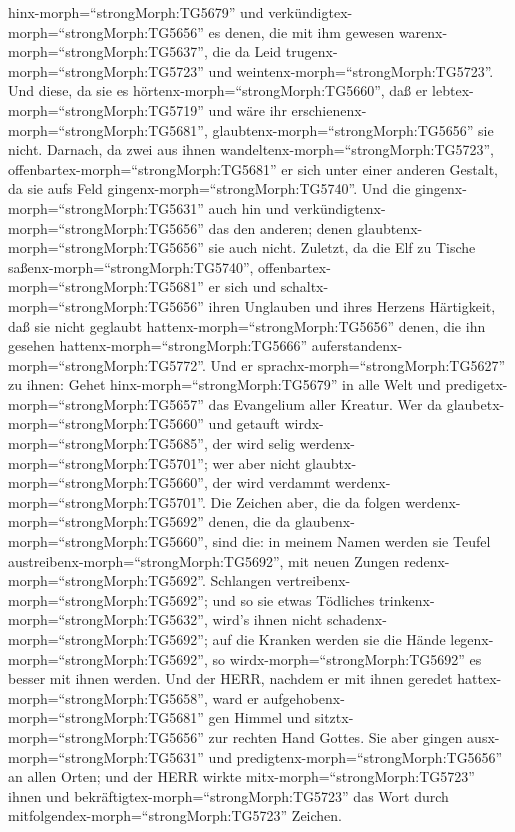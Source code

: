 hinx-morph=``strongMorph:TG5679'' und
verkündigtex-morph=``strongMorph:TG5656'' es denen, die mit ihm gewesen
warenx-morph=``strongMorph:TG5637'', die da Leid
trugenx-morph=``strongMorph:TG5723'' und
weintenx-morph=``strongMorph:TG5723''.  Und diese, da sie
es hörtenx-morph=``strongMorph:TG5660'', daß er
lebtex-morph=``strongMorph:TG5719'' und wäre ihr
erschienenx-morph=``strongMorph:TG5681'',
glaubtenx-morph=``strongMorph:TG5656'' sie nicht.  Darnach,
da zwei aus ihnen wandeltenx-morph=``strongMorph:TG5723'',
offenbartex-morph=``strongMorph:TG5681'' er sich unter einer anderen
Gestalt, da sie aufs Feld gingenx-morph=``strongMorph:TG5740''.
 Und die gingenx-morph=``strongMorph:TG5631'' auch hin und
verkündigtenx-morph=``strongMorph:TG5656'' das den anderen; denen
glaubtenx-morph=``strongMorph:TG5656'' sie auch nicht. 
Zuletzt, da die Elf zu Tische saßenx-morph=``strongMorph:TG5740'',
offenbartex-morph=``strongMorph:TG5681'' er sich und
schaltx-morph=``strongMorph:TG5656'' ihren Unglauben und ihres Herzens
Härtigkeit, daß sie nicht geglaubt hattenx-morph=``strongMorph:TG5656''
denen, die ihn gesehen hattenx-morph=``strongMorph:TG5666''
auferstandenx-morph=``strongMorph:TG5772''.  Und er
sprachx-morph=``strongMorph:TG5627'' zu ihnen: Gehet
hinx-morph=``strongMorph:TG5679'' in alle Welt und
predigetx-morph=``strongMorph:TG5657'' das Evangelium aller Kreatur.
 Wer da glaubetx-morph=``strongMorph:TG5660'' und getauft
wirdx-morph=``strongMorph:TG5685'', der wird selig
werdenx-morph=``strongMorph:TG5701''; wer aber nicht
glaubtx-morph=``strongMorph:TG5660'', der wird verdammt
werdenx-morph=``strongMorph:TG5701''.  Die Zeichen aber,
die da folgen werdenx-morph=``strongMorph:TG5692'' denen, die da
glaubenx-morph=``strongMorph:TG5660'', sind die: in meinem Namen werden
sie Teufel austreibenx-morph=``strongMorph:TG5692'', mit neuen Zungen
redenx-morph=``strongMorph:TG5692''.  Schlangen
vertreibenx-morph=``strongMorph:TG5692''; und so sie etwas Tödliches
trinkenx-morph=``strongMorph:TG5632'', wird's ihnen nicht
schadenx-morph=``strongMorph:TG5692''; auf die Kranken werden sie die
Hände legenx-morph=``strongMorph:TG5692'', so
wirdx-morph=``strongMorph:TG5692'' es besser mit ihnen werden.
 Und der HERR, nachdem er mit ihnen geredet
hattex-morph=``strongMorph:TG5658'', ward er
aufgehobenx-morph=``strongMorph:TG5681'' gen Himmel und
sitztx-morph=``strongMorph:TG5656'' zur rechten Hand Gottes.
 Sie aber gingen ausx-morph=``strongMorph:TG5631'' und
predigtenx-morph=``strongMorph:TG5656'' an allen Orten; und der HERR
wirkte mitx-morph=``strongMorph:TG5723'' ihnen und
bekräftigtex-morph=``strongMorph:TG5723'' das Wort durch
mitfolgendex-morph=``strongMorph:TG5723'' Zeichen.
